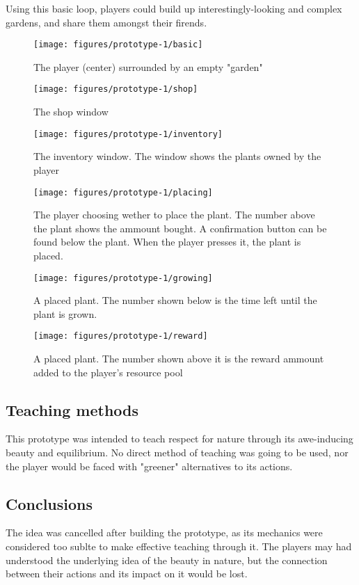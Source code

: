 Using this basic loop, players could build up interestingly-looking and
complex gardens, and share them amongst their firends.

\begin{figure}
    \centering
    \texttt{[image: figures/prototype-1/basic]}
    \caption{The player (center) surrounded by an empty "garden"}
    \label{fig:basic}
\end{figure}

\begin{figure}
    \centering
    \texttt{[image: figures/prototype-1/shop]}
    \caption{The shop window}
    \label{fig:shop}
\end{figure}

\begin{figure}
    \centering
    \texttt{[image: figures/prototype-1/inventory]}
    \caption{The inventory window. The window shows the plants owned by the
		player}
    \label{fig:inventory}
\end{figure}

\begin{figure}
    \centering
    \texttt{[image: figures/prototype-1/placing]}
    \caption{The player choosing wether to place the plant.
		The number above the plant shows the ammount bought. A confirmation
		button can be found below the plant. When the player presses it, the
		plant is placed.}
    \label{fig:placing}
\end{figure}

\begin{figure}
    \centering
    \texttt{[image: figures/prototype-1/growing]}
    \caption{A placed plant. The number shown below is the time left until
		the plant is grown.}
    \label{fig:growing}
\end{figure}

\begin{figure}
    \centering
    \texttt{[image: figures/prototype-1/reward]}
    \caption{A placed plant. The number shown above it is the reward ammount
		added to the player's resource pool}
    \label{fig:reward}
\end{figure}

\subsection{Teaching methods}

This prototype was intended to teach respect for nature through its 
awe-inducing beauty and equilibrium. No direct method of teaching
was going to be used, nor the player would be faced with "greener" alternatives
to its actions.

\subsection{Conclusions}
The idea was cancelled after building the prototype, as its mechanics were
considered too sublte to make effective teaching through it. The players
may had understood the underlying idea of the beauty in nature, but the
connection between their actions and its impact on it would be lost.

